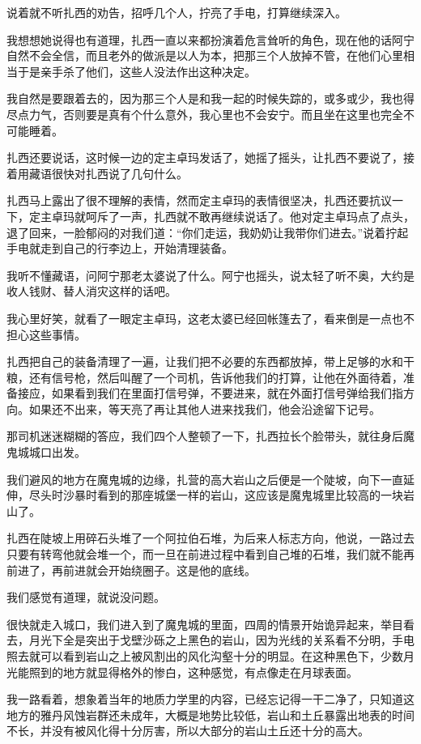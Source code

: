 说着就不听扎西的劝告，招呼几个人，拧亮了手电，打算继续深入。

我想想她说得也有道理，扎西一直以来都扮演着危言耸听的角色，现在他的话阿宁自然不会全信，而且老外的做派是以人为本，把那三个人放掉不管，在他们心里相当于是亲手杀了他们，这些人没法作出这种决定。

我自然是要跟着去的，因为那三个人是和我一起的时候失踪的，或多或少，我也得尽点力气，否则要是真有个什么意外，我心里也不会安宁。而且坐在这里也完全不可能睡着。

扎西还要说话，这时候一边的定主卓玛发话了，她摇了摇头，让扎西不要说了，接着用藏语很快对扎西说了几句什么。

扎西马上露出了很不理解的表情，然而定主卓玛的表情很坚决，扎西还要抗议一下，定主卓玛就呵斥了一声，扎西就不敢再继续说话了。他对定主卓玛点了点头，退了回来，一脸郁闷的对我们道：“你们走运，我奶奶让我带你们进去。”说着拧起手电就走到自己的行李边上，开始清理装备。

我听不懂藏语，问阿宁那老太婆说了什么。阿宁也摇头，说太轻了听不奥，大约是收人钱财、替人消灾这样的话吧。

我心里好笑，就看了一眼定主卓玛，这老太婆已经回帐篷去了，看来倒是一点也不担心这些事情。

扎西把自己的装备清理了一遍，让我们把不必要的东西都放掉，带上足够的水和干粮，还有信号枪，然后叫醒了一个司机，告诉他我们的打算，让他在外面待着，准备接应，如果看到我们在里面打信号弹，不要进来，就在外面打信号弹给我们指方向。如果还不出来，等天亮了再让其他人进来找我们，他会沿途留下记号。

那司机迷迷糊糊的答应，我们四个人整顿了一下，扎西拉长个脸带头，就往身后魔鬼城城口出发。

我们避风的地方在魔鬼城的边缘，扎营的高大岩山之后便是一个陡坡，向下一直延伸，尽头时沙暴时看到的那座城堡一样的岩山，这应该是魔鬼城里比较高的一块岩山了。

扎西在陡坡上用碎石头堆了一个阿拉伯石堆，为后来人标志方向，他说，一路过去只要有转弯他就会堆一个，而一旦在前进过程中看到自己堆的石堆，我们就不能再前进了，再前进就会开始绕圈子。这是他的底线。

我们感觉有道理，就说没问题。

很快就走入城口，我们进入到了魔鬼城的里面，四周的情景开始诡异起来，举目看去，月光下全是突出于戈壁沙砾之上黑色的岩山，因为光线的关系看不分明，手电照去就可以看到岩山之上被风割出的风化沟壑十分的明显。在这种黑色下，少数月光能照到的地方就显得格外的惨白，这种感觉，有点像走在月球表面。

我一路看着，想象着当年的地质力学里的内容，已经忘记得一干二净了，只知道这地方的雅丹风蚀岩群还未成年，大概是地势比较低，岩山和土丘暴露出地表的时间不长，并没有被风化得十分厉害，所以大部分的岩山土丘还十分的高大。

